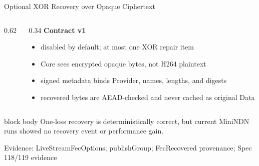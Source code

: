 \documentclass[aspectratio=169]{beamer}
\newcommand{\bluebox}[1]{%
  \begin{beamercolorbox}[rounded=true,shadow=false,sep=0.65em,wd=0.94\linewidth]{block body}
  #1
  \end{beamercolorbox}
}
\newcommand{\evidence}[1]{%
  \vfill\par\noindent
  \begin{minipage}{\linewidth}
  \raggedright{\color{SoftGray}\tiny Evidence: #1}\par
  \end{minipage}
}
\begin{document}
\begin{frame}{Optional XOR Recovery over Opaque Ciphertext}
\footnotesize
\begin{columns}[T]
\begin{column}{0.62\textwidth}
\begin{center}
\end{center}
\end{column}
\begin{column}{0.34\textwidth}
\textbf{Contract v1}
\begin{itemize}
  \item disabled by default; at most one XOR repair item
  \item Core sees encrypted opaque bytes, not H264 plaintext
  \item signed metadata binds Provider, names, lengths, and digests
  \item recovered bytes are AEAD-checked and never cached as original Data
\end{itemize}
\end{column}
\end{columns}

\vspace{0.55em}
\bluebox{One-loss recovery is deterministically correct, but current MiniNDN runs showed no recovery event or performance gain.}
\evidence{LiveStreamFecOptions; publishGroup; FecRecovered provenance; Spec 118/119 evidence}
\end{frame}
\end{document}
